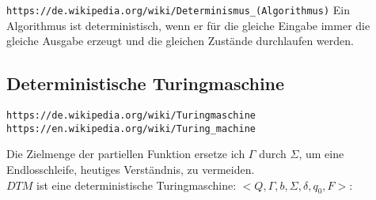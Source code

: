\documentclass[10pt,a4paper]{article}
\begin{document}
\verb+https://de.wikipedia.org/wiki/Determinismus_(Algorithmus)+
\vskip 8pt
Ein Algorithmus ist deterministisch, wenn er für die gleiche Eingabe immer die
gleiche Ausgabe erzeugt und die gleichen Zustände durchlaufen werden.

\subsection {Deterministische Turingmaschine}

\verb+https://de.wikipedia.org/wiki/Turingmaschine+ \\
\verb+https://en.wikipedia.org/wiki/Turing_machine+
\vskip 8pt

Die Zielmenge der partiellen Funktion ersetze ich $\Gamma$ durch $\Sigma$,
um eine Endlosschleife, heutiges Verständnis, zu vermeiden. \\

\noindent
$DTM$ ist eine deterministische Turingmaschine: $<Q, \Gamma, b, \Sigma, \delta, q_0, F >$:
\end{document}
